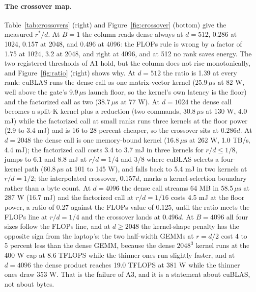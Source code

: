 \documentclass{article}
\newcommand{\rstar}{r^{*}}
\newcommand{\us}{\,\mu\mathrm{s}}
\begin{document}
\paragraph{The crossover map.} Table~\ref{tab:crossovers} (right) and Figure~\ref{fig:crossover} (bottom) give the measured $\rstar/d$. At $B = 1$ the column reads dense always at $d = 512$, 0.286 at 1024, 0.157 at 2048, and 0.496 at 4096: the FLOPs rule is wrong by a factor of 1.75 at 1024, 3.2 at 2048, and right at 4096, and at 512 no rank saves energy. The two registered thresholds of A1 hold, but the column does not rise monotonically, and Figure~\ref{fig:ratio} (right) shows why. At $d = 512$ the ratio is 1.39 at every rank: cuBLAS runs the dense call as one matrix-vector kernel (25.9$\us$ at 82 W, well above the gate's 9.9$\us$ launch floor, so the kernel's own latency is the floor) and the factorized call as two (38.7$\us$ at 77 W). At $d = 1024$ the dense call becomes a split-K kernel plus a reduction (two commands, 30.8$\us$ at 130 W, 4.0 mJ) while the factorized call at small ranks runs three kernels at the floor power (2.9 to 3.4 mJ) and is 16 to 28 percent cheaper, so the crossover sits at $0.286d$. At $d = 2048$ the dense call is one memory-bound kernel (16.8$\us$ at 262 W, 1.0 TB/s, 4.4 mJ); the factorized call costs 3.4 to 3.7 mJ in three kernels for $r/d \leq 1/8$, jumps to 6.1 and 8.8 mJ at $r/d = 1/4$ and $3/8$ where cuBLAS selects a four-kernel path (60.8$\us$ at 101 to 145 W), and falls back to 5.4 mJ in two kernels at $r/d = 1/2$; the interpolated crossover, $0.157d$, marks a kernel-selection boundary rather than a byte count. At $d = 4096$ the dense call streams 64 MB in 58.5$\us$ at 287 W (16.7 mJ) and the factorized call at $r/d = 1/16$ costs 4.5 mJ at the floor power, a ratio of 0.27 against the FLOPs value of 0.125, until the ratio meets the FLOPs line at $r/d = 1/4$ and the crossover lands at $0.496d$. At $B = 4096$ all four sizes follow the FLOPs line, and at $d \geq 2048$ the kernel-shape penalty has the opposite sign from the laptop's: the two half-width GEMMs at $r = d/2$ cost 4 to 5 percent less than the dense GEMM, because the dense $2048^3$ kernel runs at the 400 W cap at 8.6 TFLOPS while the thinner ones run slightly faster, and at $d = 4096$ the dense product reaches 19.0 TFLOPS at 381 W while the thinner ones draw 353 W. That is the failure of A3, and it is a statement about cuBLAS, not about bytes.
\end{document}
